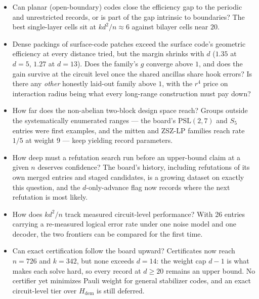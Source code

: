 \documentclass[11pt]{article}
\newcommand{\eff}{kd^2/n}
\begin{document}
	\begin{itemize}[nosep]
		\item Can planar (open-boundary) codes close the efficiency gap to
		the periodic and unrestricted records, or is part of the gap
		intrinsic to boundaries? The best single-layer cells sit at
		$\eff\approx 6$ against bilayer cells near $20$.
		\item Dense packings of surface-code patches exceed the surface
		code's geometric efficiency at every distance tried, but the margin
		shrinks with $d$ ($1.35$ at $d=5$, $1.27$ at $d=13$). Does the
		family's $g$ converge above $1$, and does the gain survive at the
		circuit level once the shared ancillas share hook errors? Is there
		any \emph{other} honestly laid-out family above $1$, with the $r^4$
		price on interaction radius being what every long-range construction
		must pay down?
		\item How far does the non-abelian two-block design space reach?
		Groups outside the systematically enumerated ranges --- the board's
		$\mathrm{PSL}(2,7)$ and $S_5$ entries were first examples, and the
		mitten and ZSZ-LP families reach rate $1/5$ at weight 9 --- keep
		yielding record parameters.
		\item How deep must a refutation search run before an upper-bound
		claim at a given $n$ deserves confidence? The board's history,
		including refutations of its own merged entries and staged
		candidates, is a growing dataset on exactly this question, and the
		$d$-only-advance flag now records where the next refutation is most
		likely.
		\item How does $\eff$ track measured circuit-level performance? With
		26 entries carrying a re-measured logical error rate under one noise
		model and one decoder, the two frontiers can be compared for the
		first time.
		\item Can exact certification follow the board upward? Certificates
		now reach $n=726$ and $k=342$, but none exceeds $d=14$: the
		weight cap $d-1$ is what makes each solve hard, so every record at
		$d\ge 20$ remains an upper bound. No certifier yet minimizes Pauli
		weight for general stabilizer codes, and an exact circuit-level
		tier over $H_{\mathrm{dem}}$ is still deferred.
	\end{itemize}

	{\small
	
	
	}
\end{document}
